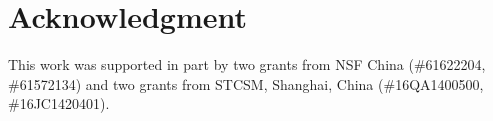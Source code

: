 \documentclass[journal]{IEEEtran}
\begin{document}
\section*{Acknowledgment}
This work was supported in part by two grants from NSF China (\#61622204, \#61572134) and two grants from STCSM, Shanghai, China (\#16QA1400500, \#16JC1420401).


\scriptsize




\end{document}
